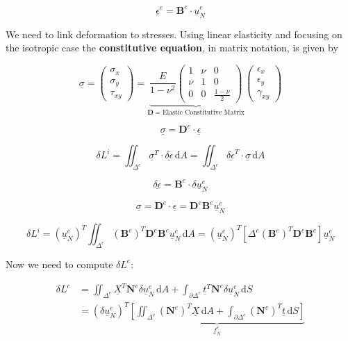\documentclass{article}
\begin{document}
\[
\underline{\epsilon}^e = \mathbf{B}^e \cdot \underline{u}^e_N
\]

We need to link deformation to stresses. Using linear elasticity and
focusing on the isotropic case the \textbf{constitutive equation}, in
matrix notation, is given by

\[
\underline{\sigma} = 
\left( 
\begin{matrix}
\sigma_x \\
\sigma_y \\
\tau_{xy}
\end{matrix}
\right) 
= \underbrace{\frac{E}{1 - \nu^2}
\left( 
\begin{matrix}
  1 & \nu &   0 \\
\nu &   1 &   0 \\
  0 &   0 & \frac{1-\nu}{2} 
\end{matrix}
\right)}_{\mathbf{D} = \text{Elastic Constitutive Matrix}}
\left( 
\begin{matrix}
\epsilon_x \\
\epsilon_y \\
\gamma_{xy}
\end{matrix}
\right)
\]

\[
\underline{\sigma} = \mathbf{D}^e \cdot \underline{\epsilon}
\]

    \[
\delta L^i = \iint_{\Delta^e} \underline{\sigma}^T \cdot \underline{\delta \epsilon}\, \mathrm{d}A = \iint_{\Delta^e} \underline{\delta \epsilon}^T \cdot \underline{\sigma} \, \mathrm{d}A
\]

\[
\underline{\delta \epsilon} = \mathbf{B}^e \cdot \delta \underline{u}^e_N
\]

\[
\underline{\sigma} = \mathbf{D}^e \cdot \underline{\epsilon} = \mathbf{D}^e \mathbf{B}^e \underline{u}^e_N
\]

\[
\delta L^i = (\underline{u}^e_N)^T \iint_{\Delta^e} (\mathbf{B}^e)^T \mathbf{D}^e \mathbf{B}^e \underline{u}^e_N \, \mathrm{d}A = (\underline{u}^e_N)^T \left[ \Delta^e (\mathbf{B}^e)^T \mathbf{D}^e \mathbf{B}^e \right] \underline{u}^e_N
\]

Now we need to compute \(\delta L^e\):


\begin{align*}
\delta L^e &= \iint_{\Delta^e} \underline{X}^T \mathbf{N}^e \delta \underline{u}^e_N\, \mathrm{d}A + \int_{\partial \Delta^e} \underline{t}^T \mathbf{N}^e \delta \underline{u}^e_N
\, \mathrm{d}S \\
&= (\delta \underline{u}^e_N)^T \underbrace{\left[ \iint_{\Delta^e} (\mathbf{N}^e)^T \underline{X} \, \mathrm{d}A + \int_{\partial \Delta^e} (\mathbf{N}^e)^T
\underline{t}\, \mathrm{d}S \right]}_{\underline{f}^e_N}
\end{align*}
\end{document}
